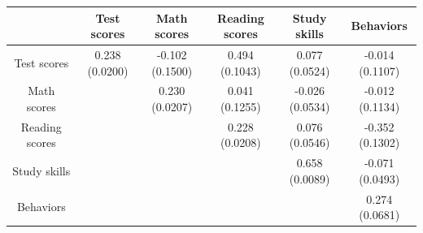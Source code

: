 \begin{tabular}{cccccc}
\toprule
 & Test scores & Math scores & Reading scores & Study skills & Behaviors \\
\midrule
Test scores & 0.238 (0.0200) & -0.102 (0.1500) & 0.494 (0.1043) & 0.077 (0.0524) & -0.014 (0.1107) \\
Math scores &  & 0.230 (0.0207) & 0.041 (0.1255) & -0.026 (0.0534) & -0.012 (0.1134) \\
Reading scores &  &  & 0.228 (0.0208) & 0.076 (0.0546) & -0.352 (0.1302) \\
Study skills &  &  &  & 0.658 (0.0089) & -0.071 (0.0493) \\
Behaviors &  &  &  &  & 0.274 (0.0681) \\
\bottomrule
\end{tabular}
